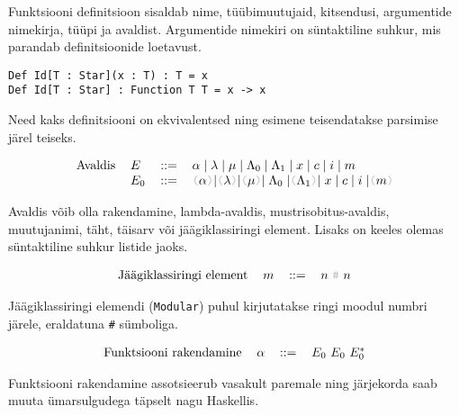 \documentclass[12pt]{article}
\begin{document}
    Funktsiooni definitsioon sisaldab nime, tüübimuutujaid, kitsendusi, argumentide nimekirja, tüüpi ja avaldist. Argumentide nimekiri on süntaktiline suhkur, mis parandab definitsioonide loetavust.

    \begin{verbatim}Def Id[T : Star](x : T) : T = x
Def Id[T : Star] : Function T T = x -> x\end{verbatim}

    Need kaks definitsiooni on ekvivalentsed ning esimene teisendatakse parsimise järel teiseks.

    \begin{equation*}
      \begin{tabular}{llll}
        Avaldis & $E$   & $::=$ & $\alpha\mid\lambda\mid\mu\mid\Lambda_0\mid\Lambda_1\mid x\mid c\mid i\mid m$ \\
                & $E_0$ & $::=$ & {\color{helehall}\verb!(!}$\alpha${\color{helehall}\verb!)!}$\mid${\color{helehall}\verb!(!}$\lambda${\color{helehall}\verb!)!}$\mid${\color{helehall}\verb!(!}$\mu${\color{helehall}\verb!)!}$\mid\Lambda_0\mid${\color{helehall}\verb!(!}$\Lambda_1${\color{helehall}\verb!)!}$\mid x\mid c\mid i\mid${\color{helehall}\verb!(!}$m${\color{helehall}\verb!)!}
      \end{tabular}
    \end{equation*}

    Avaldis võib olla rakendamine, lambda-avaldis, mustrisobitus-avaldis, muutujanimi, täht, täisarv või jäägiklassiringi element. Lisaks on keeles olemas süntaktiline suhkur listide jaoks.

    \begin{equation*}
      \begin{tabular}{llll}
        Jäägiklassiringi element & $m$ & $::=$ & $n$ {\color{helehall}\verb!#!} $n$
      \end{tabular}
    \end{equation*}

    Jäägiklassiringi elemendi (\verb!Modular!) puhul kirjutatakse ringi moodul numbri järele, eraldatuna {\color{helehall}\verb!#!} sümboliga.

    \begin{equation*}
      \begin{tabular}{llll}
        Funktsiooni rakendamine & $\alpha$ & $::=$ & $E_0$ $E_0$ $E_0^*$
      \end{tabular}
    \end{equation*}

    Funktsiooni rakendamine assotsieerub vasakult paremale ning järjekorda saab muuta ümarsulgudega täpselt nagu Haskellis.
\end{document}
